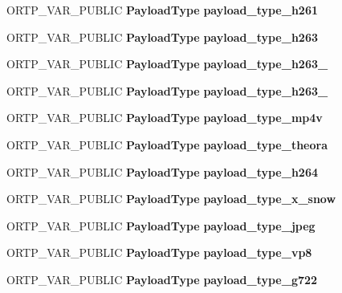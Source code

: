 \begin{DoxyCompactItemize}
\item 
\mbox{\label{payloadtype_8h_a0076999406db23d2e8188cfd409498de}} 
O\+R\+T\+P\+\_\+\+V\+A\+R\+\_\+\+P\+U\+B\+L\+IC \textbf{ Payload\+Type} {\bfseries payload\+\_\+type\+\_\+h261}
\item 
\mbox{\label{payloadtype_8h_af87b4cbba73f3f6d7527268abc218937}} 
O\+R\+T\+P\+\_\+\+V\+A\+R\+\_\+\+P\+U\+B\+L\+IC \textbf{ Payload\+Type} {\bfseries payload\+\_\+type\+\_\+h263}
\item 
\mbox{\label{payloadtype_8h_ac4c9b5fbf0ecae11a698d568da9abc9d}} 
O\+R\+T\+P\+\_\+\+V\+A\+R\+\_\+\+P\+U\+B\+L\+IC \textbf{ Payload\+Type} {\bfseries payload\+\_\+type\+\_\+h263\+\_}
\item 
\mbox{\label{payloadtype_8h_abd1da679662738b653100d493771f3ce}} 
O\+R\+T\+P\+\_\+\+V\+A\+R\+\_\+\+P\+U\+B\+L\+IC \textbf{ Payload\+Type} {\bfseries payload\+\_\+type\+\_\+h263\+\_}
\item 
\mbox{\label{payloadtype_8h_ae7d98a8c13262f58cc5d6117dee95186}} 
O\+R\+T\+P\+\_\+\+V\+A\+R\+\_\+\+P\+U\+B\+L\+IC \textbf{ Payload\+Type} {\bfseries payload\+\_\+type\+\_\+mp4v}
\item 
\mbox{\label{payloadtype_8h_aa2dce1cc2d404326d120b393d60ae4cc}} 
O\+R\+T\+P\+\_\+\+V\+A\+R\+\_\+\+P\+U\+B\+L\+IC \textbf{ Payload\+Type} {\bfseries payload\+\_\+type\+\_\+theora}
\item 
\mbox{\label{payloadtype_8h_a6d1d81f8f34a5f26f729f17be96e08ab}} 
O\+R\+T\+P\+\_\+\+V\+A\+R\+\_\+\+P\+U\+B\+L\+IC \textbf{ Payload\+Type} {\bfseries payload\+\_\+type\+\_\+h264}
\item 
\mbox{\label{payloadtype_8h_ae27bbb7fe62c663e729cbaa2b772e822}} 
O\+R\+T\+P\+\_\+\+V\+A\+R\+\_\+\+P\+U\+B\+L\+IC \textbf{ Payload\+Type} {\bfseries payload\+\_\+type\+\_\+x\+\_\+snow}
\item 
\mbox{\label{payloadtype_8h_aed137588eddbc7e4cf9c3eb7665c6dda}} 
O\+R\+T\+P\+\_\+\+V\+A\+R\+\_\+\+P\+U\+B\+L\+IC \textbf{ Payload\+Type} {\bfseries payload\+\_\+type\+\_\+jpeg}
\item 
\mbox{\label{payloadtype_8h_a5577100053eca875b68bed565bc4b941}} 
O\+R\+T\+P\+\_\+\+V\+A\+R\+\_\+\+P\+U\+B\+L\+IC \textbf{ Payload\+Type} {\bfseries payload\+\_\+type\+\_\+vp8}
\item 
\mbox{\label{payloadtype_8h_a8cb6c3f04e57414a7285ed0e27499a1d}} 
O\+R\+T\+P\+\_\+\+V\+A\+R\+\_\+\+P\+U\+B\+L\+IC \textbf{ Payload\+Type} {\bfseries payload\+\_\+type\+\_\+g722}
\item 
\mbox{\label{payloadtype_8h_ad16f4e4a6e13c269dd0a666321277da6}} 

\end{DoxyCompactItemize}
